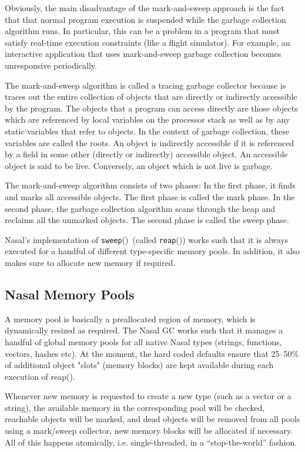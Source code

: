 \documentclass{article}
\newcommand{\func}[1]{\textcolor{func}{\tt #1}}
\newcommand{\nasalapi}[1]{\func{#1}}
\newcommand{\fp}{\textcolor{func}{()}}
\begin{document}
Obviously, the main disadvantage of the mark-and-sweep approach is the fact that that normal program execution is suspended while the garbage collection algorithm runs.  In particular, this can be a problem in a program that must satisfy real-time execution constraints (like a flight simulator).  For example, an interactive application that uses mark-and-sweep garbage collection becomes unresponsive periodically.

The mark-and-sweep algorithm is called a tracing garbage collector because is traces out the entire collection of objects that are directly or indirectly accessible by the program.  The objects that a program can access directly are those objects which are referenced by local variables on the processor stack as well as by any static variables that refer to objects.  In the context of garbage collection, these variables are called the roots.  An object is indirectly accessible if it is referenced by a field in some other (directly or indirectly) accessible object.  An accessible object is said to be live.  Conversely, an object which is not live is garbage.

The mark-and-sweep algorithm consists of two phases: In the first phase, it finds and marks all accessible objects.  The first phase is called the mark phase.  In the second phase, the garbage collection algorithm scans through the heap and reclaims all the unmarked objects.  The second phase is called the sweep phase.

Nasal's implementation of \nasalapi{sweep}\fp\ (called \nasalapi{reap}\fp) works such that it is always executed for a handful of different type-specific memory pools.  In addition, it also makes sure to allocate new memory if required.

\subsection {Nasal Memory Pools}
A memory pool is basically a preallocated region of memory, which is dynamically resized as required.  The Nasal GC works such that it manages a handful of global memory pools for all native Nasal types (strings, functions, vectors, hashes etc). At the moment, the hard coded defaults ensure that 25--50\% of additional object "slots" (memory blocks) are kept available during each execution of reap().

Whenever new memory is requested to create a new type (such as a vector or a string), the available memory in the corresponding pool will be checked, reachable objects will be marked, and dead objects will be removed from all pools using a mark/sweep collector, new memory blocks will be allocated if necessary.  All of this happens atomically, i.e. single-threaded, in a ``stop-the-world'' fashion.
\end{document}
